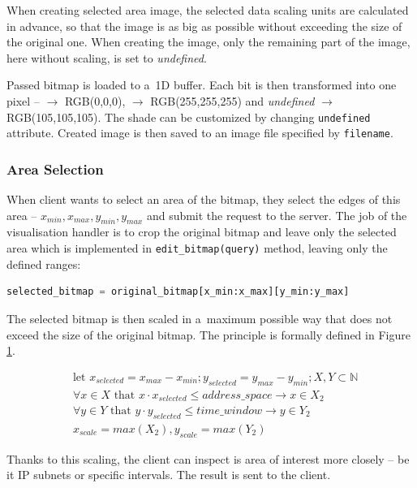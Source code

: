 When creating selected area image, the selected data scaling units are calculated in advance,
so that the image is as big as possible without exceeding the size of the original one.
When creating the image, only the remaining part of the image, here without scaling, is
set to \textit{undefined}.

Passed bitmap is loaded to a~1D buffer. Each bit is then transformed into one pixel --
 $\rightarrow$ RGB(0,0,0),  $\rightarrow$ RGB(255,255,255) and
\textit{undefined} $\rightarrow$ RGB(105,105,105). The shade can be customized
by changing \texttt{undefined} attribute. Created image is then saved
to an image file specified by \texttt{filename}.

\subsubsection{Area Selection}
When client wants to select an area of the bitmap, they select the edges of this area --
$x_{min}, x_{max}, y_{min}, y_{max}$ and submit the request to the server. The job of
the visualisation handler is to crop the original bitmap and leave only the selected area
which is implemented in \texttt{edit\_bitmap(query)} method, leaving only the
defined ranges:

\begin{lstlisting}[language=Python]
   selected_bitmap = original_bitmap[x_min:x_max][y_min:y_max]
\end{lstlisting}

The selected bitmap is then scaled in a~maximum possible way that
does not exceed the size of the original bitmap. The principle is
formally defined in Figure \ref{fig:selected_scaling}.
\begin{figure}[H]\label{fig:selected_scaling}
   \begin{align*}
      &\mbox{let } x_{selected} = x_{max} - x_{min}; y_{selected} = y_{max} - y_{min}; X,Y \subset \mathbb{N}\\
      &\forall x \in X \mbox{ that } x \cdot x_{selected} \le address\_space \rightarrow x \in X_{2}\\
      &\forall y \in Y \mbox{ that } y \cdot y_{selected} \le time\_window \rightarrow y \in Y_{2}\\
      &x_{scale} = max(X_2), y_{scale} = max(Y_2)
   \end{align*}
\end{figure}
Thanks to this scaling, the client can inspect is area of interest more closely -- be it IP subnets or
specific intervals. The result is sent to the client.




